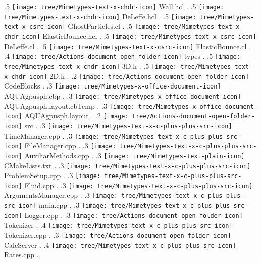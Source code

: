 {.5 { \texttt{[image: tree/Mimetypes-text-x-chdr-icon]} Wall.hcl }.
.5 { \texttt{[image: tree/Mimetypes-text-x-chdr-icon]} DeLeffe.hcl }.
.5 { \texttt{[image: tree/Mimetypes-text-x-csrc-icon]} GhostParticles.cl }.
.5 { \texttt{[image: tree/Mimetypes-text-x-chdr-icon]} ElasticBounce.hcl }.
.5 { \texttt{[image: tree/Mimetypes-text-x-csrc-icon]} DeLeffe.cl }.
.5 { \texttt{[image: tree/Mimetypes-text-x-csrc-icon]} ElasticBounce.cl }.
.4 { \texttt{[image: tree/Actions-document-open-folder-icon]} types }.
.5 { \texttt{[image: tree/Mimetypes-text-x-chdr-icon]} 3D.h }.
.5 { \texttt{[image: tree/Mimetypes-text-x-chdr-icon]} 2D.h }.
.2 { \texttt{[image: tree/Actions-document-open-folder-icon]} CodeBlocks }.
.3 { \texttt{[image: tree/Mimetypes-x-office-document-icon]} AQUAgpusph.cbp }.
.3 { \texttt{[image: tree/Mimetypes-x-office-document-icon]} AQUAgpusph.layout.cbTemp }.
.3 { \texttt{[image: tree/Mimetypes-x-office-document-icon]} AQUAgpusph.layout }.
.2 { \texttt{[image: tree/Actions-document-open-folder-icon]} src }.
.3 { \texttt{[image: tree/Mimetypes-text-x-c-plus-plus-src-icon]} TimeManager.cpp }.
.3 { \texttt{[image: tree/Mimetypes-text-x-c-plus-plus-src-icon]} FileManager.cpp }.
.3 { \texttt{[image: tree/Mimetypes-text-x-c-plus-plus-src-icon]} AuxiliarMethods.cpp }.
.3 { \texttt{[image: tree/Mimetypes-text-plain-icon]} CMakeLists.txt }.
.3 { \texttt{[image: tree/Mimetypes-text-x-c-plus-plus-src-icon]} ProblemSetup.cpp }.
.3 { \texttt{[image: tree/Mimetypes-text-x-c-plus-plus-src-icon]} Fluid.cpp }.
.3 { \texttt{[image: tree/Mimetypes-text-x-c-plus-plus-src-icon]} ArgumentsManager.cpp }.
.3 { \texttt{[image: tree/Mimetypes-text-x-c-plus-plus-src-icon]} main.cpp }.
.3 { \texttt{[image: tree/Mimetypes-text-x-c-plus-plus-src-icon]} Logger.cpp }.
.3 { \texttt{[image: tree/Actions-document-open-folder-icon]} Tokenizer }.
.4 { \texttt{[image: tree/Mimetypes-text-x-c-plus-plus-src-icon]} Tokenizer.cpp }.
.3 { \texttt{[image: tree/Actions-document-open-folder-icon]} CalcServer }.
.4 { \texttt{[image: tree/Mimetypes-text-x-c-plus-plus-src-icon]} Rates.cpp }.
}

